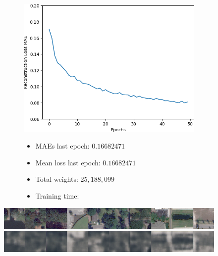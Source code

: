 \vspace{-3em}

\begin{figure}[H]
    \centering
    \begin{subfigure}{.5\textwidth}
        \centering
        \includegraphics[width=\textwidth]
        {images/figures/experiments_architecture/mae_graphKernel3adjusted2x2x256_dim1024.png}
    \end{subfigure}%
    \begin{subfigure}{.5\textwidth}
      \begin{itemize}
          \item MAEs last epoch: $0.16682471$
          \item Mean loss last epoch: $0.16682471$
          \item Total weights: $25,188,099$
          \item Training time:
      \end{itemize}
    \end{subfigure}
\end{figure}

\vspace{-2em}

\begin{figure}[H]
    \centering
    \includegraphics[width=\textwidth]
    {images/figures/experiments_architecture/inputsKernel3adjusted2x2x256_dim1024.png}
    \includegraphics[width=\textwidth]
    {images/figures/experiments_architecture/reconstructionsKernel3adjusted2x2x256_dim1024.png}
\end{figure}



